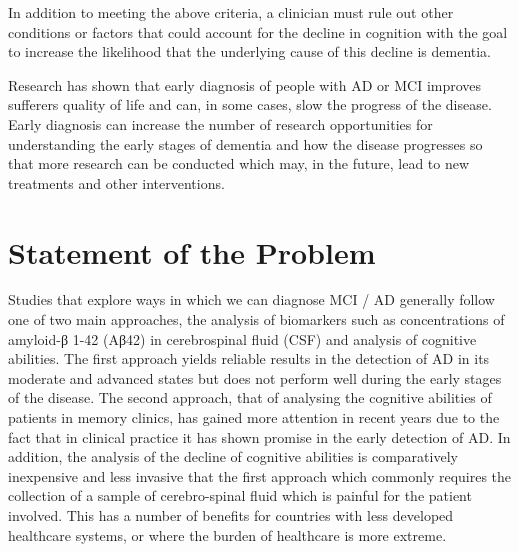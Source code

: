 In addition to meeting the above criteria, a clinician must rule out other conditions or factors that could account for the decline in cognition with the goal to increase the likelihood that the underlying cause of this decline is dementia. 
\par
Research has shown that early diagnosis of people with AD or MCI improves sufferers quality of life and can, in some cases, slow the progress of the disease. Early diagnosis can increase the number of research opportunities for understanding the early stages of dementia and how the disease progresses so that more research can be conducted which may, in the future, lead to new treatments and other interventions.
\section{Statement of the Problem}
Studies that explore ways in which we can diagnose MCI / AD generally follow one of two main approaches, the analysis of biomarkers such as concentrations of amyloid-β 1-42 (Aβ42) in cerebrospinal fluid (CSF) and analysis of cognitive abilities. The first approach yields reliable results in the detection of AD in its moderate and advanced states but does not perform well during the early stages of the disease. The second approach, that of analysing the cognitive abilities of patients in memory clinics, has gained more attention in recent years due to the fact that in clinical practice it has shown promise in the early detection of AD. In addition, the analysis of the decline of cognitive abilities is comparatively inexpensive and less invasive that the first approach which commonly requires the collection of a sample of cerebro-spinal fluid which is painful for the patient involved. This has a number of benefits for countries with less developed healthcare systems, or where the burden of healthcare is more extreme. 
\par
